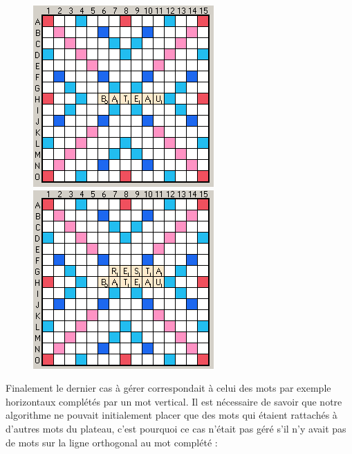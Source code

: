 \documentclass[a4paper,8pt,french,fleqn]{article}
\begin{document}
\begin{figure}[h]
  \begin{center}
    \vspace{0.2cm}
    \includegraphics[scale=0.5]{cas3a.png}
    \hspace{1.5cm}
    \includegraphics[scale=0.5]{cas3b.png}
  \end{center}
\end{figure}

Finalement le dernier cas à gérer correspondait à celui des mots par exemple horizontaux complétés par un mot vertical. Il est nécessaire de savoir que notre algorithme ne pouvait initialement placer que des mots qui étaient rattachés à d'autres mots du plateau, c'est pourquoi ce cas n'était pas géré s'il n'y avait pas de mots sur la ligne orthogonal au mot complété :
\end{document}
